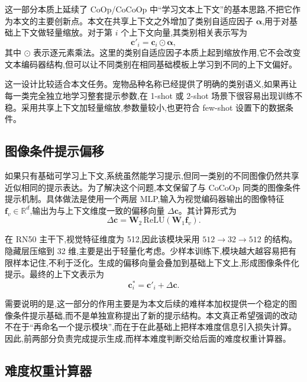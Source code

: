 这一部分本质上延续了 CoOp/CoCoOp 中“学习文本上下文”的基本思路,不把它作为本文的主要创新点。本文在共享上下文之外增加了类别自适应因子 \(\boldsymbol{\alpha}\),用于对基础上下文做轻量缩放。对于第 \(i\) 个上下文向量,其类别相关表示写为
\begin{equation}
\mathbf{c}'_{i} = \mathbf{c}_{i} \odot \boldsymbol{\alpha},
\end{equation}
其中 \(\odot\) 表示逐元素乘法。这里的类别自适应因子本质上起到缩放作用,它不会改变文本编码器结构,但可以让不同类别在相同基础模板上学习到不同的上下文偏好。

这一设计比较适合本文任务。宠物品种名称已经提供了明确的类别语义,如果再让每一类完全独立地学习整套提示参数,在 1-shot 或 2-shot 场景下很容易出现训练不稳。采用共享上下文加轻量缩放,参数量较小,也更符合 few-shot 设置下的数据条件。

\subsection{图像条件提示偏移}

如果只有基础可学习上下文,系统虽然能学习提示,但同一类别的不同图像仍然共享近似相同的提示表达。为了解决这个问题,本文保留了与 CoCoOp 同类的图像条件提示机制。具体做法是使用一个两层 MLP,输入为视觉编码器输出的图像特征 \(\mathbf{f}_v \in \mathbb{R}^{d}\),输出为与上下文维度一致的偏移向量 \(\Delta \mathbf{c}\)。其计算形式为
\begin{equation}
\Delta \mathbf{c} = \mathbf{W}_2 \, \mathrm{ReLU}(\mathbf{W}_1 \mathbf{f}_v).
\end{equation}

在 RN50 主干下,视觉特征维度为 512,因此该模块采用 \(512 \rightarrow 32 \rightarrow 512\) 的结构。隐藏层压缩到 32 维,主要是出于轻量化考虑。少样本训练下,模块越大越容易把有限样本记住,不利于泛化。生成的偏移向量会叠加到基础上下文上,形成图像条件化提示。最终的上下文表示为
\begin{equation}
\mathbf{c}^{*}_{i} = \mathbf{c}'_{i} + \Delta \mathbf{c}.
\end{equation}

需要说明的是,这一部分的作用主要是为本文后续的难样本加权提供一个稳定的图像条件提示基础,而不是单独宣称提出了新的提示结构。本文真正希望强调的改动不在于“再命名一个提示模块”,而在于在此基础上把样本难度信息引入损失计算。因此,前两部分负责完成提示生成,而样本难度判断交给后面的难度权重计算器。

\subsection{难度权重计算器}

